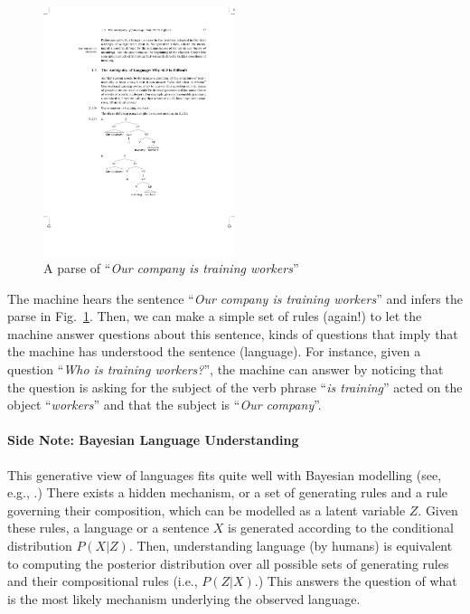 \documentclass{report}
\begin{document}
\begin{figure}[ht]
    \centering
    \includegraphics[width=0.5\textwidth]{figures/manning_parse.pdf}
    \caption{A parse of ``{\it Our company is training workers}''}
    \label{fig:manning_parse}
\end{figure}

The machine hears the sentence ``{\it Our company is training workers}'' and
infers the parse in Fig.~\ref{fig:manning_parse}. Then, we can make a simple set
of rules (again!) to let the machine answer questions about this sentence, kinds
of questions that imply that the machine has understood the sentence (language).
For instance, given a question ``{\it Who is training workers?}'', the machine
can answer by noticing that the question is asking for the subject of the verb
phrase
``{\it is training}'' acted on the object ``{\it workers}'' and that the subject
is ``{\it Our company}''.

\paragraph{Side Note: Bayesian Language Understanding} This generative view of
languages fits quite well with Bayesian modelling (see, e.g.,
\cite{perfors2006poverty}.) There exists a hidden mechanism, or a set of
generating rules and a rule governing their composition, which can be modelled
as a latent variable $Z$.  Given these rules, a language or a sentence $X$ is
generated according to the conditional distribution $P(X|Z)$. Then,
understanding language (by humans) is equivalent to computing the posterior
distribution over all possible sets of generating rules and their compositional
rules (i.e., $P(Z|X)$.) This answers the question of what is the most likely
mechanism underlying the observed language.
\end{document}
